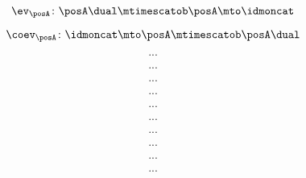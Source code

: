 \begin{forslides}
     \begin{equation}
        \label{eq:slides_trace_monoidal_29}
       \ev_\posA \colon \posA\dual \mtimescatob \posA \mto \idmoncat
    \end{equation}
    
     \begin{equation}
        \label{eq:slides_trace_monoidal_30}
       \coev_\posA \colon \idmoncat \mto \posA \mtimescatob \posA\dual
    \end{equation}
    
     \begin{equation}
        \label{eq:slides_trace_monoidal_31}
       ...
    \end{equation}
    
    \begin{equation}
        \label{eq:slides_trace_monoidal_32}
       ...
    \end{equation}
    
     \begin{equation}
        \label{eq:slides_trace_monoidal_33}
       ...
    \end{equation}
    
     \begin{equation}
        \label{eq:slides_trace_monoidal_34}
       ...
    \end{equation}
    
     \begin{equation}
        \label{eq:slides_trace_monoidal_35}
       ...
    \end{equation}
    
     \begin{equation}
        \label{eq:slides_trace_monoidal_36}
       ...
    \end{equation}
    
     \begin{equation}
        \label{eq:slides_trace_monoidal_37}
       ...
    \end{equation}
    
     \begin{equation}
        \label{eq:slides_trace_monoidal_38}
       ...
    \end{equation}
    
    \begin{equation}
        \label{eq:slides_trace_monoidal_39}
       ...
    \end{equation}
    
     \begin{equation}
        \label{eq:slides_trace_monoidal_40}
       ...
    \end{equation}
    

\end{forslides}
